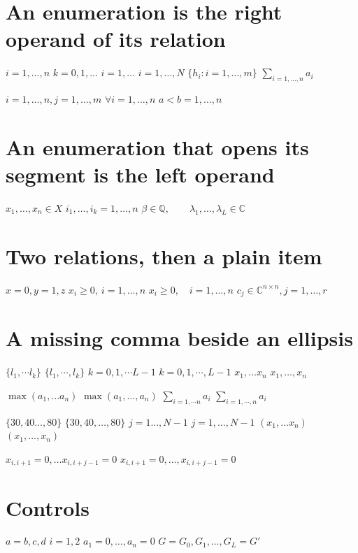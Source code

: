 \documentclass{article}
\begin{document}
\section{An enumeration is the right operand of its relation}
$i=1,\ldots,n$ $k=0,1,\ldots$ $i=1,\ldots$ $i=1,\dots,N$ $\{h_i : i=1,\ldots,m\}$ $\sum_{i=1,\ldots,n} a_i$

$i=1,\ldots,n, j=1,\ldots,m$ $\forall i=1,\ldots,n$ $a<b=1,\ldots,n$

\section{An enumeration that opens its segment is the left operand}
$x_1,\ldots,x_n\in X$ $i_1,\ldots,i_k=1,\ldots,n$ $\beta\in\mathbb{Q},\qquad\lambda_1,\ldots,\lambda_L\in\mathbb{C}$

\section{Two relations, then a plain item}
$x=0, y=1, z$ $x_i\ge 0,\ i=1,\ldots,n$ $x_i\ge 0,\quad i=1,\ldots,n$ $c_{j}\in\mathbb{C}^{n\times n},j=1,\ldots,r$

\section{A missing comma beside an ellipsis}
$\{l_1,\cdots l_k\}$ $\{l_1,\cdots,l_k\}$ $k=0,1,\cdots L-1$ $k=0,1,\cdots,L-1$ $x_1,\ldots x_n$ $x_1,\ldots,x_n$

$\max(a_1,\ldots a_n)$ $\max(a_1,\ldots,a_n)$ $\sum_{i=1,\cdots n}a_i$ $\sum_{i=1,\cdots,n}a_i$

$\{30,40\ldots,80\}$ $\{30,40,\ldots,80\}$ $j=1\dots,N-1$ $j=1,\dots,N-1$ $(x_1,\ldots x_n)$ $(x_1,\ldots,x_n)$

$x_{i,i+1}=0,\dots x_{i,i+j-1}=0$ $x_{i,i+1}=0,\dots, x_{i,i+j-1}=0$

\section{Controls}
$a=b,c,d$ $i=1,2$ $a_1=0,\ldots,a_n=0$ $G=G_0,G_1,\dots,G_L=G'$
\end{document}
